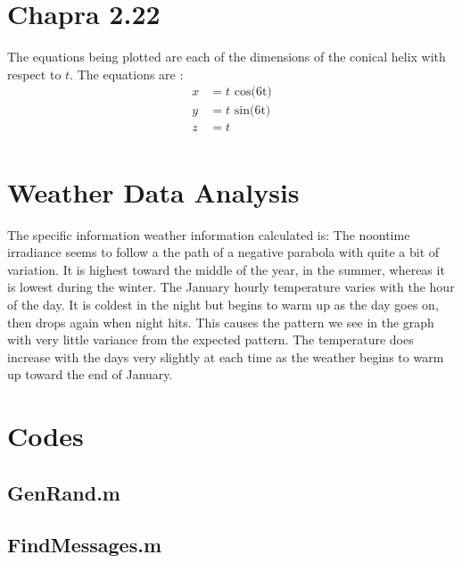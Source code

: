 \documentclass{article}
\begin{document}
\section{Chapra 2.22}
The equations being plotted are each of the dimensions of the conical helix  with respect to $t$.
The equations are \cite[p.~51]{Chapra}:
\begin{align*}
x &= t\mbox{ cos(6t)}\\
y &= t\mbox{ sin(6t)}\\
z &= t\\
\end{align*}

\section{Weather Data Analysis}
The specific information weather information calculated is:
The noontime irradiance seems to follow a the path of a negative parabola with quite a bit of variation. It is highest toward the middle of the year, in the summer, whereas it is lowest during the winter. The January hourly temperature varies with the hour of the day. It is coldest in the night but begins to warm up as the day goes on, then drops again when night hits. This causes the pattern we see in the graph with very little variance from the expected pattern. The temperature does increase with the days very slightly at each time as the weather begins to warm up toward the end of January.

\pagebreak
\appendix
\section{Codes}



\subsection{GenRand.m}
\clearpage
\subsection{FindMessages.m}
\clearpage
\end{document}
